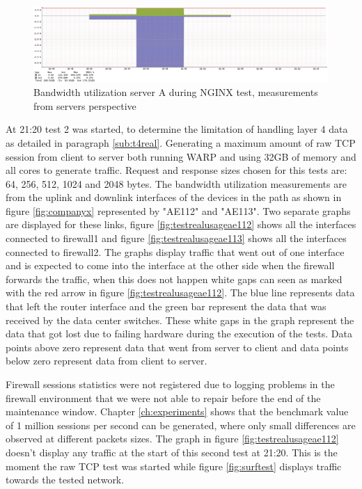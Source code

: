\begin{figure}[H]
  \includegraphics[scale=0.35]{images/real-nginx.png}
  \caption{Bandwidth utilization server A during NGINX test, measurements from servers perspective }
  \label{fig:realnginx}
\end{figure}

At 21:20 test 2 was started, to determine the limitation of handling layer 4 data as detailed in paragraph \ref{sub:t4real}.
Generating a maximum amount of raw TCP session from client to server both running WARP and using 32GB of memory and all cores to generate traffic.
Request and response sizes chosen for this tests are: 64, 256, 512, 1024 and 2048 bytes. 
The bandwidth utilization measurements are from the uplink and downlink interfaces of the devices in the path as shown in figure \ref{fig:companyx} represented by "AE112" and "AE113".
Two separate graphs are displayed for these links, figure \ref{fig:testrealusageae112} shows all the interfaces connected to firewall1 and figure \ref{fig:testrealusageae113} shows all the interfaces connected to firewall2.
The graphs display traffic that went out of one interface and is expected to come into the interface at the other side when the firewall forwards the traffic, when this does not happen white gaps can seen as marked with the red arrow in figure \ref{fig:testrealusageae112}. 
The blue line represents data that left the router interface and the green bar represent the data that was received by the data center switches. 
These white gaps in the graph represent the data that got lost due to failing hardware during the execution of the tests. 
Data points above zero represent data that went from server to client and data points below zero represent data from client to server.  
 
Firewall sessions statistics were not registered due to logging problems in the firewall environment that we were not able to repair before the end of the maintenance window. 
Chapter \ref{ch:experiments} shows that the benchmark value of 1 million sessions per second can be generated, where only small differences are observed at different packets sizes. 
The graph in figure \ref{fig:testrealusageae112} doesn't display any traffic at the start of this second test at 21:20. This is the moment the raw TCP test was started while figure \ref{fig:surftest} displays traffic towards the tested network. 
 
